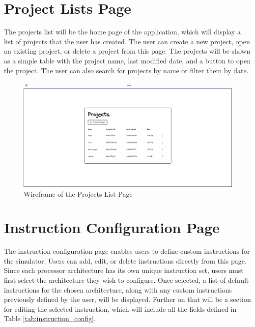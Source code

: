\section{Project Lists Page}

The projects list will be the home page of the application, which will display a list of projects that the user has created. The user can create a new project, open an existing project, or delete a project from this page. The projects will be shown as a simple table with the project name, last modified date, and a button to open the project. The user can also search for projects by name or filter them by date.

\begin{figure}[H]
    \centering
    \includegraphics[width=1\textwidth]{assets/images/projects_list_wireframe.png}
    \caption{Wireframe of the Projects List Page}
    \label{fig:projects_list_wireframe}
\end{figure}

\section{Instruction Configuration Page}
The instruction configuration page enables users to define custom instructions for the simulator. Users can add, edit, or delete instructions directly from this page. Since each processor architecture has its own unique instruction set, users must first select the architecture they wish to configure. Once selected, a list of default instructions for the chosen architecture, along with any custom instructions previously defined by the user, will be displayed. Further on that will be a section for editing the selected instruction, which will include all the fields defined in Table \ref{tab:instruction_config}. 



